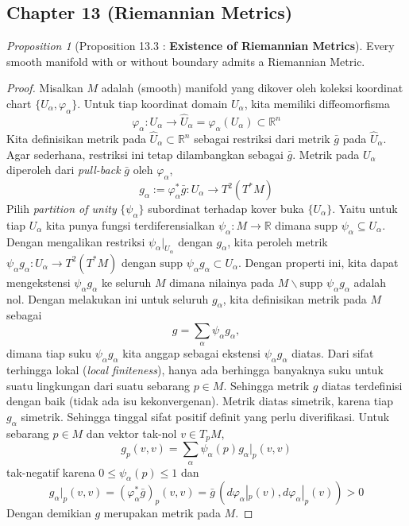 \documentclass[a4paper]{article}
\theoremstyle{remark}
\newtheorem{prop}{Proposition}
\begin{document}
\subsection{Chapter 13 (Riemannian Metrics)}
\begin{prop} [Proposition 13.3 : \textbf{Existence of Riemannian Metrics}] Every smooth manifold with or without boundary admits a Riemannian Metric.
\end{prop}
\begin{proof}
Misalkan $M$ adalah (smooth) manifold yang dikover oleh koleksi koordinat chart $\{U_{\alpha}, \varphi_{\alpha}\}$. Untuk tiap koordinat domain $U_{\alpha}$, kita memiliki diffeomorfisma
$$
\varphi_{\alpha} : U_{\alpha} \rightarrow \hat{U}_{\alpha} = \varphi_{\alpha}(U_{\alpha}) \subset \mathbb{R}^n 
$$
Kita definisikan metrik pada $\hat{U}_{\alpha} \subset \mathbb{R}^n$ sebagai restriksi dari metrik $\bar{g}$ pada $\hat{U}_{\alpha}$. Agar sederhana, restriksi ini tetap dilambangkan sebagai $\bar{g}$. Metrik pada $U_{\alpha}$ diperoleh dari \textit{pull-back} $\bar{g}$ oleh $\varphi_{\alpha}$, 
$$
g_{\alpha}:= \varphi_{\alpha}^* \bar{g} : U_{\alpha} \rightarrow T^2(T^*M)
$$
Pilih \textit{partition of unity} $\{\psi_{\alpha}\}$ subordinat terhadap kover buka $\{U_{\alpha}\}$. Yaitu untuk tiap $U_{\alpha}$ kita punya fungsi terdiferensialkan $\psi_{\alpha} : M \rightarrow \mathbb{R}$ dimana $\text{supp } \psi_{\alpha} \subseteq U_{\alpha}$. Dengan mengalikan restriksi $\psi_{\alpha}|_{U_{\alpha}}$ dengan $g_{\alpha}$, kita peroleh metrik $\psi_{\alpha} g_{\alpha} : U_{\alpha} \rightarrow T^2(T^*M)$ dengan $\text{supp }\psi_{\alpha} g_{\alpha} \subset U_{\alpha}$. Dengan properti ini, kita dapat mengekstensi $\psi_{\alpha}g_{\alpha}$ ke seluruh $M$ dimana nilainya pada $M\smallsetminus \text{supp }\psi_{\alpha}g_{\alpha}$ adalah nol. Dengan melakukan ini untuk seluruh $g_{\alpha}$, kita definisikan metrik pada $M$ sebagai 
$$
g = \sum_{\alpha} \psi_{\alpha}g_{\alpha},
$$
dimana tiap suku $\psi_{\alpha}g_{\alpha}$ kita anggap sebagai ekstensi $\psi_{\alpha}g_{\alpha}$ diatas. Dari sifat terhingga lokal (\textit{local finiteness}), hanya ada berhingga banyaknya suku untuk suatu lingkungan dari suatu sebarang $p \in M$. Sehingga metrik $g$ diatas terdefinisi dengan baik (tidak ada isu kekonvergenan). Metrik diatas simetrik, karena tiap $g_{\alpha}$ simetrik. Sehingga tinggal sifat positif definit yang perlu diverifikasi. Untuk sebarang $p \in M$ dan vektor tak-nol $v \in T_pM$,
$$
g_p(v,v) = \sum_{\alpha} \psi_{\alpha}(p) g_{\alpha}|_p (v,v)
$$
tak-negatif karena $ 0 \leq\psi_{\alpha}(p) \leq 1$ dan 
$$
g_{\alpha}|_p(v,v) = (\varphi^*_{\alpha} \bar{g})_p (v,v) = \bar{g} \, (d\varphi_{\alpha}|_p (v) , d\varphi_{\alpha}|_p (v)) > 0
$$
Dengan demikian $g$ merupakan metrik pada $M$.
\end{proof}
\end{document}
